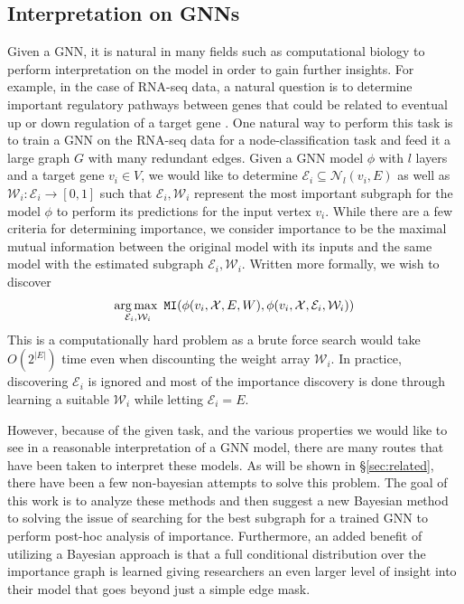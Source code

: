 \subsection{Interpretation on GNNs}
\label{sec:intro-interp}
Given a GNN, it is natural in many fields such as computational biology to perform interpretation on the model in order to gain further insights. For example, in the case of RNA-seq data, a natural question is to determine important regulatory pathways between genes that could be related to eventual up or down regulation of a target gene \cite{petralia_new_2016}. One natural way to perform this task is to train a GNN on the RNA-seq data for a node-classification task and feed it a large graph $G$ with many redundant edges. Given a GNN model $\phi$ with $l$ layers and a target gene $v_{i} \in V$, we would like to determine $\mathcal{E}_{i} \subseteq \mathcal{N}_{l}(v_{i}, E)$ as well as $\mathcal{W}_{i} : \mathcal{E}_{i} \rightarrow [0,1]$ such that $\mathcal{E}_{i}, \mathcal{W}_{i}$ represent the most important subgraph for the model $\phi$ to perform its predictions for the input vertex $v_{i}$. While there are a few criteria for determining importance, we consider importance to be the maximal mutual information between the original model with its inputs and the same model with the estimated subgraph $\mathcal{E}_{i}, \mathcal{W}_{i}$. Written more formally, we wish to discover
\begin{align*}
  \operatorname*{arg\,max\,\,}_{\mathcal{E}_{i}, \mathcal{W}_{i}} \mathtt{MI}(\phi(v_{i}, \mathcal{X}, E, W), \phi(v_{i}, \mathcal{X}, \mathcal{E}_{i}, \mathcal{W}_{i}))
\end{align*}
This is a computationally hard problem as a brute force search would take $O(2^{|E|})$ time even when discounting the weight array $\mathcal{W}_{i}$. In practice, discovering $\mathcal{E}_i$ is ignored and most of the importance discovery is done through learning a suitable $\mathcal{W}_i$ while letting $\mathcal{E}_i = E$.

However, because of the given task, and the various properties we would like to see in a reasonable interpretation of a GNN model, there are many routes that have been taken to interpret these models. As will be shown in \S\ref{sec:related}, there have been a few non-bayesian attempts to solve this problem. The goal of this work is to analyze these methods and then suggest a new Bayesian method to solving the issue of searching for the best subgraph for a trained GNN to perform post-hoc analysis of importance. Furthermore, an added benefit of utilizing a Bayesian approach is that a full conditional distribution over the importance graph is learned giving researchers an even larger level of insight into their model that goes beyond just a simple edge mask.

